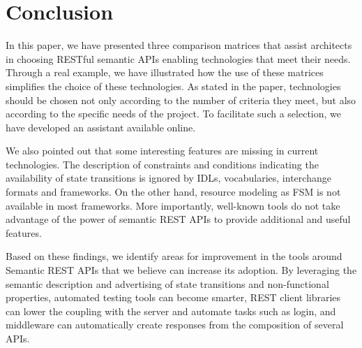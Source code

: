 \section{Conclusion}

\vspace*{-0.2cm}

In this paper, we have presented three comparison matrices that assist architects in choosing RESTful semantic APIs enabling technologies that meet their needs.
Through a real example, we have illustrated how the use of these matrices simplifies the choice of these technologies. 
As stated in the paper, technologies should be chosen not only according to the number of criteria they meet, but also according to the specific needs of the project. 
To facilitate such a selection, we have developed an assistant available online.

We also pointed out that some interesting features are missing in current technologies.
The description of constraints and conditions indicating the availability of state transitions is ignored by IDLs, vocabularies, interchange formats and frameworks. On the other hand, resource modeling as FSM is not available in most frameworks.
More importantly, well-known tools do not take advantage of the power of semantic REST APIs to provide additional and useful features.

Based on these findings, we identify areas for improvement in the tools around Semantic REST APIs that we believe can increase its adoption. By leveraging the semantic description and advertising of state transitions and non-functional properties, automated testing tools can become smarter, REST client libraries can lower the coupling with the server and automate tasks such as login, and middleware can automatically create responses from the composition of several APIs.